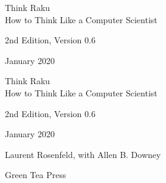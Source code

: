 \documentclass[10pt]{book}
\newcommand{\theversion}{2nd Edition, Version 0.6}
\newcommand{\thedate}{January 2020}
\begin{document}
\begin{latexonly}

\renewcommand{\blankpage}{\thispagestyle{empty} \quad \newpage}



\thispagestyle{empty}

\begin{flushright}
\vspace*{2.0in}

\begin{spacing}{3}
{\huge Think Raku}\\
{\Large How to Think Like a Computer Scientist}
\end{spacing}

\vspace{0.25in}

\theversion

\thedate

\vfill

\end{flushright}


\blankpage
\blankpage

\pagebreak
\thispagestyle{empty}

\begin{flushright}
\vspace*{2.0in}

\begin{spacing}{3}
{\huge Think Raku}\\
{\Large How to Think Like a Computer Scientist}
\end{spacing}

\vspace{0.25in}

\theversion

\thedate

\vspace{1in}


{\Large
Laurent Rosenfeld,
with Allen B. Downey\\
}


\vspace{0.5in}

{\Large Green Tea Press}


\end{flushright}
\end{latexonly}
\end{document}
